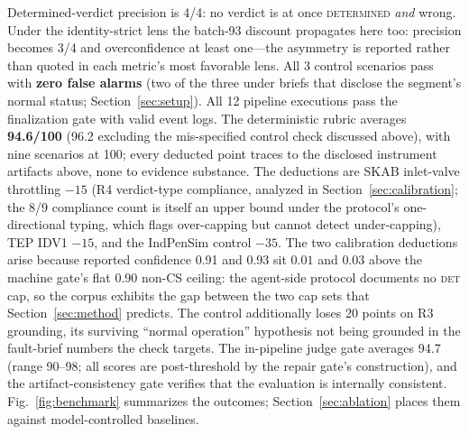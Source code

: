 \documentclass[preprint,10pt]{elsarticle}
\begin{document}
Determined-verdict precision is 4/4: no verdict is at once \mbox{\textsc{determined}} \emph{and} wrong. Under the identity-strict lens the batch-93 discount propagates here too: precision becomes 3/4 and overconfidence at least one---the asymmetry is reported rather than quoted in each metric's most favorable lens. All 3 control scenarios pass with \textbf{zero false alarms} (two of the three under briefs that disclose the segment's normal status; Section~\ref{sec:setup}). All 12 pipeline executions pass the finalization gate with valid event logs. The deterministic rubric averages \textbf{94.6/100} (96.2 excluding the mis-specified control check discussed above), with nine scenarios at 100; every deducted point traces to the disclosed instrument artifacts above, none to evidence substance. The deductions are SKAB inlet-valve throttling $-15$ (R4 verdict-type compliance, analyzed in Section~\ref{sec:calibration}; the 8/9 compliance count is itself an upper bound under the protocol's one-directional typing, which flags over-capping but cannot detect under-capping), TEP IDV1 $-15$, and the IndPenSim control $-35$. The two calibration deductions arise because reported confidence 0.91 and 0.93 sit $0.01$ and $0.03$ above the machine gate's flat 0.90 non-CS ceiling: the agent-side protocol documents no \mbox{\textsc{det}} cap, so the corpus exhibits the gap between the two cap sets that Section~\ref{sec:method} predicts. The control additionally loses 20 points on R3 grounding, its surviving ``normal operation'' hypothesis not being grounded in the fault-brief numbers the check targets. The in-pipeline judge gate averages 94.7 (range 90--98; all scores are post-threshold by the repair gate's construction), and the artifact-consistency gate verifies that the evaluation is internally consistent. Fig.~\ref{fig:benchmark} summarizes the outcomes; Section~\ref{sec:ablation} places them against model-controlled baselines.
\end{document}
